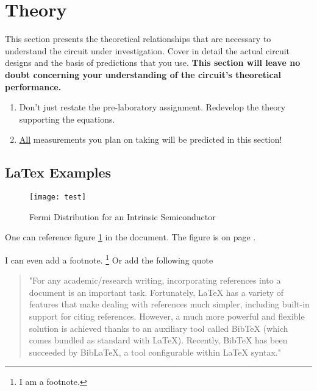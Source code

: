 \section{Theory}
This section presents the theoretical relationships that are necessary to understand the circuit under investigation. Cover in detail the actual circuit designs and the basis of predictions that you use.  \textbf{This section will leave no doubt concerning your understanding of the circuit’s theoretical performance.}

\begin{enumerate}
	\item Don’t just restate the pre-laboratory assignment.  Redevelop the theory supporting the equations.
	\item \underline{All} measurements you plan on taking will be predicted in this section!
\end{enumerate}

\subsection{LaTex Examples}

\begin{figure}[h]
	\centering
	\texttt{[image: test]}
	\caption{Fermi Distribution for an Intrinsic Semiconductor\cite{saleh2007fundamentals}}
	\label{fig:test1}
\end{figure}

One can reference figure \ref{fig:test1} in the document. The figure is on page \pageref{fig:test1}.

\bigskip
I can even add a footnote. \footnote{I am a footnote.}
Or add the following quote

\begin{quote}
	"For any academic/research writing, incorporating references into a document is an important task. Fortunately, LaTeX has a variety of features that make dealing with references much simpler, including built-in support for citing references. However, a much more powerful and flexible solution is achieved thanks to an auxiliary tool called BibTeX (which comes bundled as standard with LaTeX). Recently, BibTeX has been succeeded by BibLaTeX, a tool configurable within LaTeX syntax."\cite{bib_manage}
\end{quote}